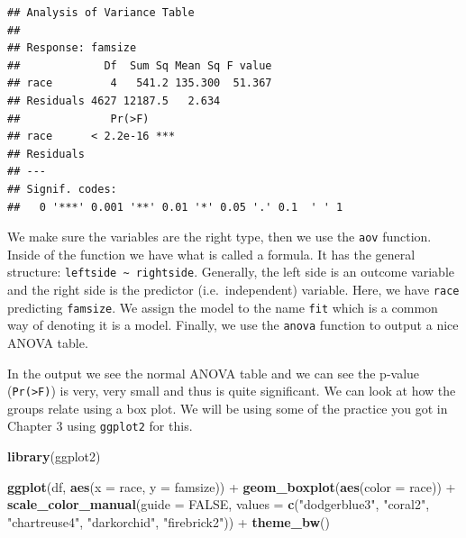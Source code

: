 \documentclass[]{tufte-book}
\newenvironment{Shaded}{}{}
\newcommand{\KeywordTok}[1]{\textcolor[rgb]{0.00,0.44,0.13}{\textbf{#1}}}
\newcommand{\DataTypeTok}[1]{\textcolor[rgb]{0.56,0.13,0.00}{#1}}
\newcommand{\StringTok}[1]{\textcolor[rgb]{0.25,0.44,0.63}{#1}}
\newcommand{\OtherTok}[1]{\textcolor[rgb]{0.00,0.44,0.13}{#1}}
\newcommand{\OperatorTok}[1]{\textcolor[rgb]{0.40,0.40,0.40}{#1}}
\newcommand{\NormalTok}[1]{#1}
\theoremstyle{definition}
\theoremstyle{definition}
\theoremstyle{remark}
\begin{document}
\begin{verbatim}
## Analysis of Variance Table
## 
## Response: famsize
##             Df  Sum Sq Mean Sq F value
## race         4   541.2 135.300  51.367
## Residuals 4627 12187.5   2.634        
##              Pr(>F)    
## race      < 2.2e-16 ***
## Residuals              
## ---
## Signif. codes:  
##   0 '***' 0.001 '**' 0.01 '*' 0.05 '.' 0.1  ' ' 1
\end{verbatim}

We make sure the variables are the right type, then we use the
\texttt{aov} function. Inside of the function we have what is called a
formula. It has the general structure:
\texttt{leftside\ \textasciitilde{}\ rightside}. Generally, the left
side is an outcome variable and the right side is the predictor
(i.e.~independent) variable. Here, we have \texttt{race} predicting
\texttt{famsize}. We assign the model to the name \texttt{fit} which is
a common way of denoting it is a model. Finally, we use the
\texttt{anova} function to output a nice ANOVA table.

In the output we see the normal ANOVA table and we can see the p-value
(\texttt{Pr(\textgreater{}F)}) is very, very small and thus is quite
significant. We can look at how the groups relate using a box plot. We
will be using some of the practice you got in Chapter 3 using
\texttt{ggplot2} for this.

\begin{Shaded}
\begin{Highlighting}[]
\KeywordTok{library}\NormalTok{(ggplot2)}

\KeywordTok{ggplot}\NormalTok{(df, }\KeywordTok{aes}\NormalTok{(}\DataTypeTok{x =}\NormalTok{ race, }\DataTypeTok{y =}\NormalTok{ famsize)) }\OperatorTok{+}\StringTok{ }\KeywordTok{geom_boxplot}\NormalTok{(}\KeywordTok{aes}\NormalTok{(}\DataTypeTok{color =}\NormalTok{ race)) }\OperatorTok{+}\StringTok{ }
\StringTok{    }\KeywordTok{scale_color_manual}\NormalTok{(}\DataTypeTok{guide =} \OtherTok{FALSE}\NormalTok{, }\DataTypeTok{values =} \KeywordTok{c}\NormalTok{(}\StringTok{"dodgerblue3"}\NormalTok{, }
        \StringTok{"coral2"}\NormalTok{, }\StringTok{"chartreuse4"}\NormalTok{, }\StringTok{"darkorchid"}\NormalTok{, }
        \StringTok{"firebrick2"}\NormalTok{)) }\OperatorTok{+}\StringTok{ }\KeywordTok{theme_bw}\NormalTok{()}
\end{Highlighting}
\end{Shaded}
\end{document}
